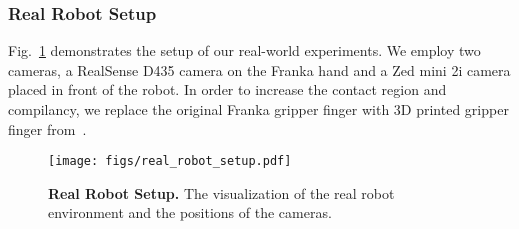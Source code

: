 \subsubsection{Real Robot Setup}\hfill 
\label{sec:appendix_robot_setup}
Fig.~\ref{fig:robot_setup} demonstrates the setup of our real-world experiments. We employ two cameras, a RealSense D435 camera on the Franka hand and a Zed mini 2i camera placed in front of the robot. In order to increase the contact region and compilancy, we replace the original Franka gripper finger with 3D printed gripper finger from~\citep{chi2024universal}.
\begin{figure}[h!]
    \centering
    \texttt{[image: figs/real\_robot\_setup.pdf]}
    \caption{\textbf{Real Robot Setup.} The visualization of the real robot environment and the positions of the cameras. }
    \label{fig:robot_setup}
\end{figure}
